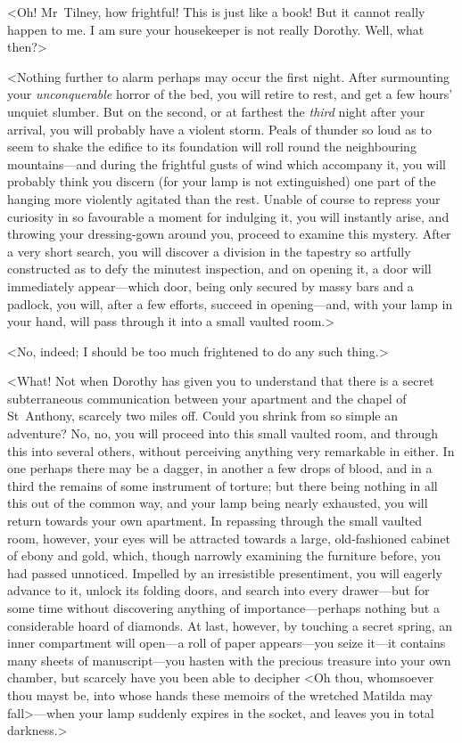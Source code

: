  <Oh! Mr~Tilney, how frightful! This is just like a book! But it cannot really happen to me. I am sure your housekeeper is not really Dorothy. Well, what then?> 

 <Nothing further to alarm perhaps may occur the first night. After surmounting your \textit{unconquerable} horror of the bed, you will retire to rest, and get a few hours' unquiet slumber. But on the second, or at farthest the \textit{third} night after your arrival, you will probably have a violent storm. Peals of thunder so loud as to seem to shake the edifice to its foundation will roll round the neighbouring mountains—and during the frightful gusts of wind which accompany it, you will probably think you discern (for your lamp is not extinguished) one part of the hanging more violently agitated than the rest. Unable of course to repress your curiosity in so favourable a moment for indulging it, you will instantly arise, and throwing your dressing-gown around you, proceed to examine this mystery. After a very short search, you will discover a division in the tapestry so artfully constructed as to defy the minutest inspection, and on opening it, a door will immediately appear—which door, being only secured by massy bars and a padlock, you will, after a few efforts, succeed in opening—and, with your lamp in your hand, will pass through it into a small vaulted room.> 

 <No, indeed; I should be too much frightened to do any such thing.> 

 <What! Not when Dorothy has given you to understand that there is a secret subterraneous communication between your apartment and the chapel of St~Anthony, scarcely two miles off. Could you shrink from so simple an adventure? No, no, you will proceed into this small vaulted room, and through this into several others, without perceiving anything very remarkable in either. In one perhaps there may be a dagger, in another a few drops of blood, and in a third the remains of some instrument of torture; but there being nothing in all this out of the common way, and your lamp being nearly exhausted, you will return towards your own apartment. In repassing through the small vaulted room, however, your eyes will be attracted towards a large, old-fashioned cabinet of ebony and gold, which, though narrowly examining the furniture before, you had passed unnoticed. Impelled by an irresistible presentiment, you will eagerly advance to it, unlock its folding doors, and search into every drawer—but for some time without discovering anything of importance—perhaps nothing but a considerable hoard of diamonds. At last, however, by touching a secret spring, an inner compartment will open—a roll of paper appears—you seize it—it contains many sheets of manuscript—you hasten with the precious treasure into your own chamber, but scarcely have you been able to decipher <Oh thou, whomsoever thou mayst be, into whose hands these memoirs of the wretched Matilda may fall>—when your lamp suddenly expires in the socket, and leaves you in total darkness.> 

